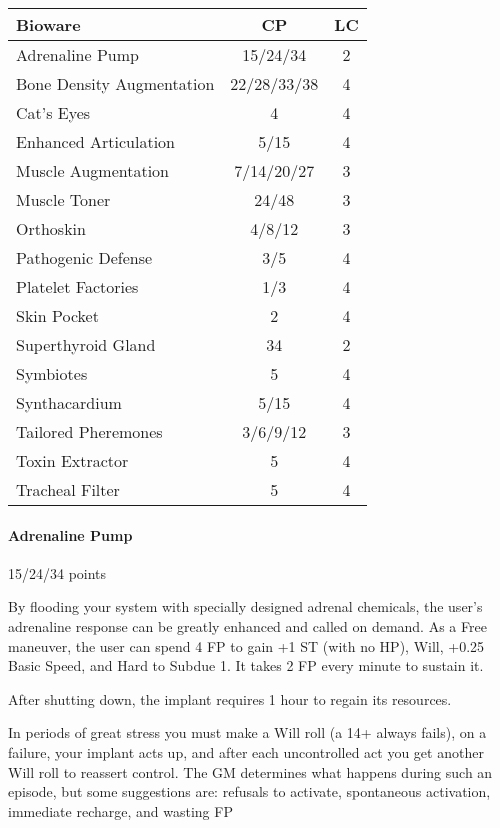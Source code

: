 \begin{multicols*}{3}
	\begin{center}
		\begin{adjustwidth}{-3mm}{}
		\begin{tabularx}{0.35\textwidth}{|X|c|c|}
			\hline
			Bioware & CP & LC\\
			\hline
			\hline
			Adrenaline Pump & 15/24/34 & 2 \\
			Bone Density Augmentation & 22/28/33/38 & 4 \\
			Cat's Eyes & 4 & 4 \\
			Enhanced Articulation & 5/15 & 4 \\
			Muscle Augmentation & 7/14/20/27 & 3 \\
			Muscle Toner & 24/48 & 3 \\
			Orthoskin & 4/8/12 & 3 \\
			Pathogenic Defense & 3/5 & 4 \\
			Platelet Factories & 1/3 & 4 \\
			Skin Pocket & 2 & 4 \\
			Superthyroid Gland & 34 & 2 \\
			Symbiotes & 5 & 4 \\
			Synthacardium & 5/15 & 4 \\
			Tailored Pheremones & 3/6/9/12 & 3 \\
			Toxin Extractor & 5 & 4 \\
			Tracheal Filter & 5 & 4 \\
			\hline
		\end{tabularx}
		\end{adjustwidth}
	\end{center}
	
	\paragraph{Adrenaline Pump}
	\begin{flushright}
		15/24/34 points
	\end{flushright}
	
	By flooding your system with specially designed adrenal chemicals, the user's adrenaline response can be greatly enhanced and called on demand. As a Free maneuver, the user can spend 4 FP to gain +1 ST (with no HP), Will, +0.25 Basic Speed, and Hard to Subdue 1. It takes 2 FP every minute to sustain it. 
	
	After shutting down, the implant requires 1 hour to regain its resources. 
	
	In periods of great stress you  must make a Will roll (a 14+ always fails), on a failure, your implant acts up, and after each uncontrolled act you get another Will roll to reassert control. The GM determines what happens during such an episode, but some suggestions are: refusals to activate, spontaneous activation, immediate recharge, and wasting FP
	

\end{multicols*}
